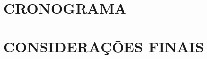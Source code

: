 \documentclass[
	12pt,				%
    oneside,			%
	a4paper,			%
	chapter=TITLE,		%
	english,			%
	brazil				%
	]{abntex2}
\begin{document}

\chapter{CRONOGRAMA}


%

\chapter{CONSIDERAÇÕES FINAIS}



\end{document}
